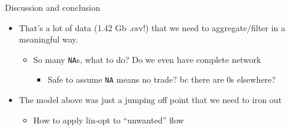 \documentclass[
  ignorenonframetext,
]{beamer}
\providecommand{\tightlist}{%
  \setlength{\itemsep}{0pt}\setlength{\parskip}{0pt}}
\begin{document}
\begin{frame}[fragile]{Discussion and conclusion}
\protect\hypertarget{discussion-and-conclusion}{}

\begin{itemize}
\tightlist
\item
  That's a lot of data (1.42 Gb .csv!) that we need to aggregate/filter
  in a meaningful way.

  \begin{itemize}
  \tightlist
  \item
    So many \texttt{NA}s, what to do? Do we even have complete network

    \begin{itemize}
    \tightlist
    \item
      Safe to assume \texttt{NA} means no trade? bc there are 0s
      elsewhere?
    \end{itemize}
  \end{itemize}
\item
  The model above was just a jumping off point that we need to iron out

  \begin{itemize}
  \tightlist
  \item
    How to apply lin-opt to ``unwanted'' flow
  \end{itemize}
\end{itemize}

\end{frame}
\end{document}
